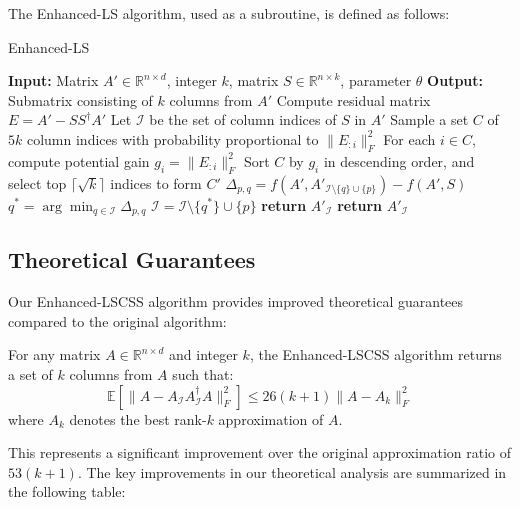 \documentclass{article}
\begin{document}
The Enhanced-LS algorithm, used as a subroutine, is defined as follows:

\begin{algorithm}[H]
\caption{Enhanced-LS}
\label{alg:enhanced-ls}
\begin{algorithmic}[1]
\STATE \textbf{Input:} Matrix $A' \in \mathbb{R}^{n \times d}$, integer $k$, matrix $S \in \mathbb{R}^{n \times k}$, parameter $\theta$
\STATE \textbf{Output:} Submatrix consisting of $k$ columns from $A'$
\STATE Compute residual matrix $E = A' - SS^\dagger A'$
\STATE Let $\mathcal{I}$ be the set of column indices of $S$ in $A'$
\STATE Sample a set $C$ of $5k$ column indices with probability proportional to $\|E_{:i}\|_F^2$
\STATE For each $i \in C$, compute potential gain $g_i = \|E_{:i}\|_F^2$
\STATE Sort $C$ by $g_i$ in descending order, and select top $\lceil \sqrt{k} \rceil$ indices to form $C'$
        \STATE $\Delta_{p,q} = f(A', A'_{\mathcal{I} \setminus \{q\} \cup \{p\}}) - f(A', S)$
    \ENDFOR
    \STATE $q^* = \arg\min_{q \in \mathcal{I}} \Delta_{p,q}$
        \STATE $\mathcal{I} = \mathcal{I} \setminus \{q^*\} \cup \{p\}$
        \STATE \textbf{return} $A'_{\mathcal{I}}$
    \ENDIF
\ENDFOR
\STATE \textbf{return} $A'_{\mathcal{I}}$
\end{algorithmic}
\end{algorithm}

\subsection{Theoretical Guarantees}
Our Enhanced-LSCSS algorithm provides improved theoretical guarantees compared to the original algorithm:

\begin{theorem}
For any matrix $A \in \mathbb{R}^{n \times d}$ and integer $k$, the Enhanced-LSCSS algorithm returns a set of $k$ columns from $A$ such that:
\[
\mathbb{E}[\|A - A_{\mathcal{I}}A_{\mathcal{I}}^\dagger A\|_F^2] \leq 26(k+1) \|A - A_k\|_F^2
\]
where $A_k$ denotes the best rank-$k$ approximation of $A$.
\end{theorem}

This represents a significant improvement over the original approximation ratio of $53(k+1)$. The key improvements in our theoretical analysis are summarized in the following table:
\end{document}
